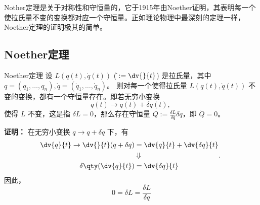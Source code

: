 
Nother定理是关于对称性和守恒量的，它于1915年由Noether证明，其表明每一个使拉氏量不变的变换都对应一个守恒量。正如理论物理中最深刻的定理一样，Noether定理的证明极其的简单。

\subsection{Noether定理}
\begin{theorem}{Noether定理}
设 $L(q(t),\dot q(t))$ ($\dot{}:=\dv{}{t}$) 是拉氏量，其中 $q=(q_1,\ldots,q_n),\dot q=(\dot q_1,\ldots,\dot q_n)$。 则对每一个使得拉氏量 $L(q(t),\dot q(t))$ 不变的变换，都有一个守恒量存在。即若无穷小变换
\begin{equation}
q(t)\rightarrow q(t)+\delta q(t),~
\end{equation}
使得 $L$ 不变，这是指 $\delta L=0$，那么存在守恒量 $Q:=\frac{\delta L}{\delta\dot q}\delta q$，即 $\dot Q=0$。
\end{theorem}
\textbf{证明：}
在无穷小变换 $q\rightarrow q+\delta q$ 下，有
\begin{equation}
\begin{aligned}
\dv{q}{t}\rightarrow\dv{}{t}(q+\delta q)&=\dv{q}{t}+\dv{\delta q}{t}\\
&\Downarrow\\
\delta\qty(\dv{q}{t})&=\dv{\delta q}{t}
\end{aligned}.~
\end{equation}
因此，
\begin{equation}
0=\delta L=\frac{\delta L}{\delta \dot q}
\end{equation}







